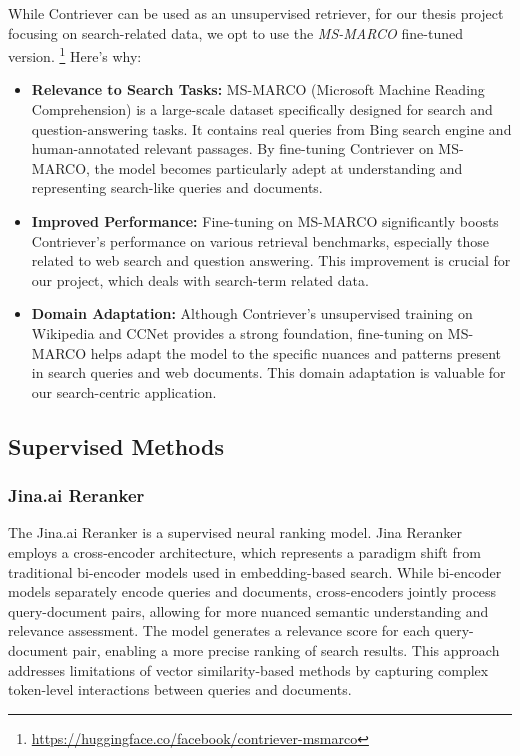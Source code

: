 While Contriever can be used as an unsupervised retriever, for our thesis project focusing on search-related data, we opt to use the \textit{MS-MARCO} fine-tuned version. \footnote{\url{https://huggingface.co/facebook/contriever-msmarco}}
Here's why:
\begin{itemize}
    \item \textbf{Relevance to Search Tasks:} MS-MARCO (Microsoft Machine Reading Comprehension) is a large-scale dataset specifically designed for search and question-answering tasks. It contains real queries from Bing search engine and human-annotated relevant passages. By fine-tuning Contriever on MS-MARCO, the model becomes particularly adept at understanding and representing search-like queries and documents.
    \item \textbf{Improved Performance:} Fine-tuning on MS-MARCO significantly boosts Contriever's performance on various retrieval benchmarks, especially those related to web search and question answering. This improvement is crucial for our project, which deals with search-term related data.
    \item \textbf{Domain Adaptation:} Although Contriever's unsupervised training on Wikipedia and CCNet provides a strong foundation, fine-tuning on MS-MARCO helps adapt the model to the specific nuances and patterns present in search queries and web documents. This domain adaptation is valuable for our search-centric application.
\end{itemize}

\subsection{Supervised Methods}\label{subsec:supervised-methods}
\subsubsection{Jina.ai Reranker}
The Jina.ai Reranker is a supervised neural ranking model.
Jina Reranker employs a cross-encoder architecture, which represents a paradigm shift from traditional bi-encoder models used in embedding-based search.
While bi-encoder models separately encode queries and documents, cross-encoders jointly process query-document pairs, allowing for more nuanced semantic understanding and relevance assessment.
The model generates a relevance score for each query-document pair, enabling a more precise ranking of search results.
This approach addresses limitations of vector similarity-based methods by capturing complex token-level interactions between queries and documents.

